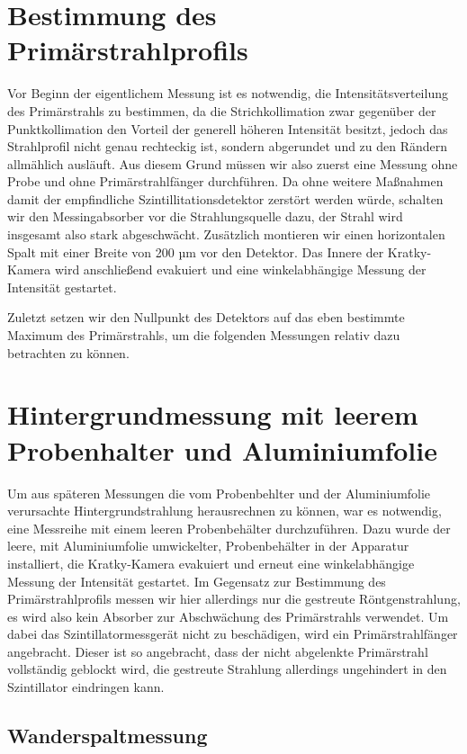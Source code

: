 \documentclass[bigchapter,colorback,accentcolor=tud4b,linedtoc,11pt]{tudreport}
\begin{document}
\section{Bestimmung des Primärstrahlprofils}

Vor Beginn der eigentlichem Messung ist es notwendig, die Intensitätsverteilung des Primärstrahls zu bestimmen, da die Strichkollimation zwar gegenüber der Punktkollimation den Vorteil der generell höheren Intensität besitzt, jedoch das Strahlprofil nicht genau rechteckig ist, sondern abgerundet und zu den Rändern allmählich ausläuft. Aus diesem Grund müssen wir also zuerst eine Messung ohne Probe und ohne Primärstrahlfänger durchführen. Da ohne weitere Maßnahmen damit der empfindliche Szintillitationsdetektor zerstört werden würde, schalten wir den Messingabsorber vor die Strahlungsquelle dazu, der Strahl wird insgesamt also stark abgeschwächt. Zusätzlich montieren wir einen horizontalen Spalt mit einer Breite von 200 µm vor den Detektor. Das Innere der Kratky-Kamera wird anschließend evakuiert und eine winkelabhängige Messung der Intensität gestartet. 

Zuletzt setzen wir den Nullpunkt des Detektors auf das eben bestimmte Maximum des Primärstrahls, um die folgenden Messungen relativ dazu betrachten zu können.

\section{Hintergrundmessung mit leerem Probenhalter und Aluminiumfolie}

Um aus späteren Messungen die vom Probenbehlter und der Aluminiumfolie verursachte Hintergrundstrahlung herausrechnen zu können, war es notwendig, eine Messreihe mit einem leeren Probenbehälter durchzuführen. Dazu wurde der leere, mit Aluminiumfolie umwickelter, Probenbehälter in der Apparatur installiert, die Kratky-Kamera evakuiert und erneut eine winkelabhängige Messung der Intensität gestartet. Im Gegensatz zur Bestimmung des Primärstrahlprofils messen wir hier allerdings nur die gestreute Röntgenstrahlung, es wird also kein Absorber zur Abschwächung des Primärstrahls verwendet. Um dabei das Szintillatormessgerät nicht zu beschädigen, wird ein Primärstrahlfänger angebracht. Dieser ist so angebracht, dass der nicht abgelenkte Primärstrahl vollständig geblockt wird, die gestreute Strahlung allerdings ungehindert in den Szintillator eindringen kann.

\subsection{Wanderspaltmessung}
\end{document}
